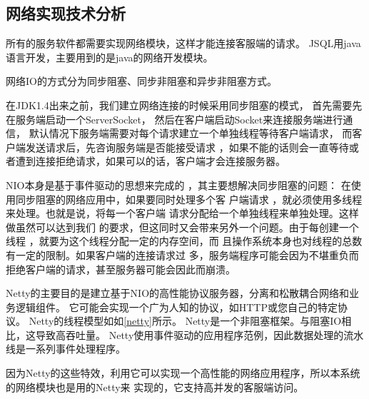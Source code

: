 \subsection{网络实现技术分析}
所有的服务软件都需要实现网络模块，这样才能连接客服端的请求。
JSQL用java语言开发，主要用到的是java的网络开发模块。

网络IO的方式分为同步阻塞、同步非阻塞和异步非阻塞方式。

在JDK1.4出来之前，我们建立网络连接的时候采用同步阻塞的模式，
首先需要先在服务端启动一个ServerSocket，
然后在客户端启动Socket来连接服务端进行通信，
默认情况下服务端需要对每个请求建立一个单独线程等待客户端请求，
而客户端发送请求后，先咨询服务端是否能接受请求
，如果不能的话则会一直等待或者遭到连接拒绝请求，如果可以的话，客户端才会连接服务器。

NIO本身是基于事件驱动的思想来完成的
，其主要想解决同步阻塞的问题：
 在使用同步阻塞的网络应用中，如果要同时处理多个客
 户端请求
 ，就必须使用多线程来处理。也就是说，将每一个客户端
 请求分配给一个单独线程来单独处理。这样做虽然可以达到我们
 的要求，但这同时又会带来另外一个问题。由于每创建一个线程
 ，就要为这个线程分配一定的内存空间，而
 且操作系统本身也对线程的总数有一定的限制。如果客户端的连接请求过
 多，服务端程序可能会因为不堪重负而
 拒绝客户端的请求，甚至服务器可能会因此而崩溃。



Netty的主要目的是建立基于NIO的高性能协议服务器，分离和松散耦合网络和业务逻辑组件。
它可能会实现一个广为人知的协议，如HTTP或您自己的特定协议。
Netty的线程模型如如\ref{netty}所示。
Netty是一个非阻塞框架。与阻塞IO相比，这导致高吞吐量。
Netty使用事件驱动的应用程序范例，因此数据处理的流水线是一系列事件处理程序。

因为Netty的这些特效，利用它可以实现一个高性能的网络应用程序，所以本系统的网络模块也是用的Netty来
实现的，它支持高并发的客服端访问。
